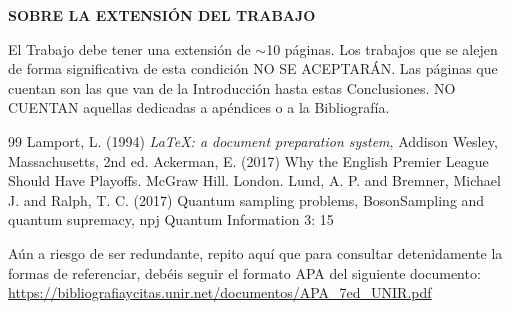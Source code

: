 \documentclass[11pt,a4paper,spanish]{book}
\begin{document}
\vspace{1cm}
{\bf{SOBRE LA EXTENSIÓN DEL TRABAJO}}
\newline

El Trabajo debe tener una extensión de $\sim$10 páginas. Los trabajos que se alejen de forma significativa de esta condición NO SE ACEPTARÁN. Las páginas que cuentan son las que van de la Introducción hasta estas Conclusiones. NO CUENTAN aquellas dedicadas a apéndices o a la Bibliografía.


\begin{thebibliography}{99}
 Lamport, L. (1994) \emph{\LaTeX: a document preparation system}, Addison
Wesley, Massachusetts, 2nd ed.
 Ackerman, E. (2017) Why the English Premier League Should Have Playoffs.  McGraw Hill. London. 
 Lund, A. P. and Bremner, Michael J. and Ralph, T. C. (2017) Quantum sampling problems, BosonSampling and quantum supremacy, npj Quantum Information 3: 15
\end{thebibliography}

\vspace{2cm}
Aún a riesgo de ser redundante, repito aquí que para consultar detenidamente la formas de referenciar, debéis seguir el formato APA del siguiente documento: \url{https://bibliografiaycitas.unir.net/documentos/APA_7ed_UNIR.pdf}

% 
%
\end{document}
